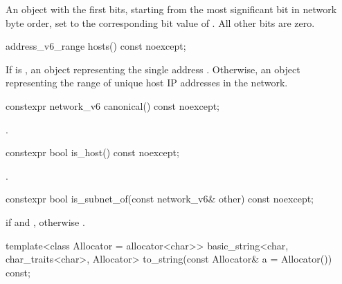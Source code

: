\begin{itemdescr}
\pnum
\returns An  object with the first  bits, starting from the most significant bit in network byte order, set to the corresponding bit value of . All other bits are zero.
\end{itemdescr}

\begin{itemdecl}
address_v6_range hosts() const noexcept;
\end{itemdecl}

\begin{itemdescr}
\pnum
\returns If  is , an  object representing the single address . Otherwise, an  object representing the range of unique host IP addresses in the network.
\end{itemdescr}

\begin{itemdecl}
constexpr network_v6 canonical() const noexcept;
\end{itemdecl}

\begin{itemdescr}
\pnum
\returns {}.
\end{itemdescr}

\begin{itemdecl}
constexpr bool is_host() const noexcept;
\end{itemdecl}

\begin{itemdescr}
\pnum
\returns {}.
\end{itemdescr}

\begin{itemdecl}
constexpr bool is_subnet_of(const network_v6& other) const noexcept;
\end{itemdecl}

\begin{itemdescr}
\pnum
\returns {} if  and , otherwise .
\end{itemdescr}

\begin{itemdecl}
template<class Allocator = allocator<char>>
  basic_string<char, char_traits<char>, Allocator>
    to_string(const Allocator& a = Allocator()) const;
\end{itemdecl}

